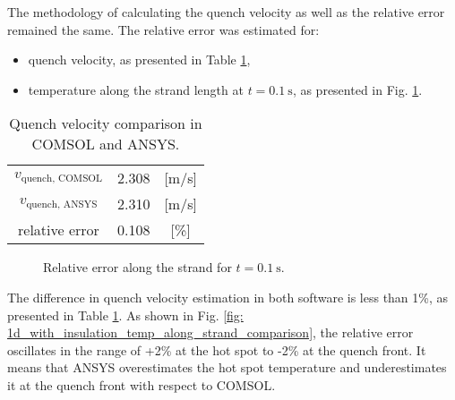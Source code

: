 The methodology of calculating the quench velocity as well as the relative error remained the same. The relative error was estimated for: 
\begin{itemize}
    \item quench velocity, as presented in Table \ref{table: 1d_with_insulation_v_quench_comparison},
    \item temperature along the strand length at $t=0.1~\text{s}$, as presented in Fig. \ref{fig: ans_comsol_comparison_f_2_2_with_insulation}.
\end{itemize}

\begin{table}[H]
    \caption{Quench velocity comparison in COMSOL and ANSYS.} 
    \vspace{-1.em} 
    \fontsize{10}{10}
    \selectfont 
    \renewcommand{\arraystretch}{1.5}
    \begin{center}
        \begin{tabular}{ ccc }  
        \hline
        $v_\text{quench, COMSOL}$ & 2.308 & [m/s] \\
        $v_\text{quench, ANSYS}$ & 2.310 & [m/s] \\
        relative error & 0.108 & [\%] \\
        \hline 
        \end{tabular}
    \end{center}  
     \label{table: 1d_with_insulation_v_quench_comparison} 
 \end{table}

\begin{figure}[H]
\centering
    \caption{Relative error along the strand for $t=0.1~\text{s}$.}
    \label{fig: ans_comsol_comparison_f_2_2_with_insulation}
\end{figure}

The difference in quench velocity estimation in both software is less than 1\%, as presented in Table \ref{table: 1d_with_insulation_v_quench_comparison}. As shown in Fig. \ref{fig: 1d_with_insulation_temp_along_strand_comparison}, the relative error oscillates in the range of +2\% at the hot spot to -2\% at the quench front. It means that ANSYS overestimates the hot spot temperature and underestimates it at the quench front with respect to COMSOL.

